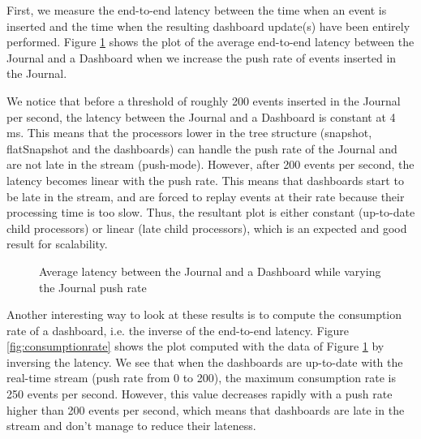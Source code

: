 First, we measure the end-to-end latency between the time when an event is inserted and the time when the resulting dashboard update(s) have been entirely performed. Figure \ref{fig:latencyplot} shows the plot of the average end-to-end latency between the Journal and a Dashboard when we increase the push rate of events inserted in the Journal.

We notice that before a threshold of roughly 200 events inserted in the Journal per second, the latency between the Journal and a Dashboard is constant at 4 ms. This means that the processors lower in the tree structure (snapshot, flatSnapshot and the dashboards) can handle the push rate of the Journal and are not late in the stream (push-mode).
However, after 200 events per second, the latency becomes linear with the push rate. This means that dashboards start to be late in the stream, and are forced to replay events at their rate because their processing time is too slow. Thus, the resultant plot is either constant (up-to-date child processors) or linear (late child processors), which is an expected and good result for scalability.
\\

\begin{figure}
  \begin{center} 
    \caption{Average latency between the Journal and a Dashboard while varying the Journal push rate}
    \label{fig:latencyplot}
  \end{center}
\end{figure}

Another interesting way to look at these results is to compute the consumption rate of a dashboard, i.e. the inverse of the end-to-end latency. Figure \ref{fig:consumptionrate} shows the plot computed with the data of Figure \ref{fig:latencyplot} by inversing the latency. We see that when the dashboards are up-to-date with the real-time stream (push rate from 0 to 200), the maximum consumption rate is 250 events per second. However, this value decreases rapidly with a push rate higher than 200 events per second, which means that dashboards are late in the stream and don't manage to reduce their lateness.
\\

